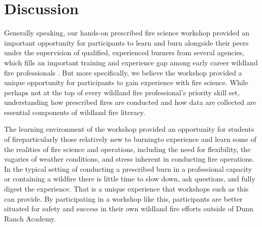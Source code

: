 \documentclass[fire,article,submit,moreauthors,pdftex]{Definitions/mdpi}
\begin{document}
\section{Discussion}

Generally speaking, our hands-on prescribed fire science workshop provided an important opportunity for participants to learn and burn alongside their peers under the supervision of qualified, experienced burners from several agencies, which fills an important training and experience gap among early career wildland fire professionals \citep{kobziar2009}.
But more specifically, we believe the workshop provided a unique opportunity for participants to gain experience with fire science.
While perhaps not at the top of every wildland fire professional's priority skill set, understanding how prescribed fires are conducted and how data are collected are essential components of wildland fire literacy.

The learning environment of the workshop provided an opportunity for students of fire\textemdash particularly those relatively new to burning\textemdash to experience and learn some of the realities of fire science and operations, including the need for flexibility, the vagaries of weather conditions, and stress inherent in conducting fire operations.
In the typical setting of conducting a prescribed burn in a professional capacity or containing a wildfire there is little time to slow down, ask questions, and fully digest the experience.
That is a unique experience that workshops such as this can provide.
By participating in a workshop like this, participants are better situated for safety and success in their own wildland fire efforts outside of Dunn Ranch Academy.
\end{document}
